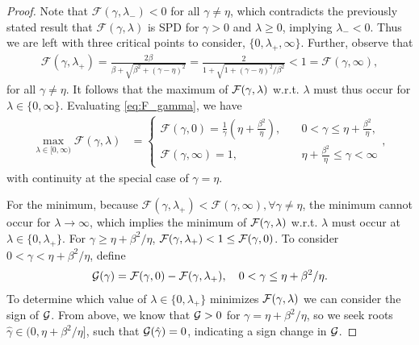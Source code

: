 \documentclass[review]{siamart}
\begin{document}
\begin{proof}
Note that $\mathcal{F}(\gamma,\lambda_-) < 0$ for all $\gamma\neq\eta$, which
contradicts the previously stated result that $\mathcal{F}(\gamma,\lambda)$ is SPD
for $\gamma > 0$ and $\lambda\geq 0$, implying $\lambda_- < 0$.
Thus we are left with three critical points to consider, 
$\{0,\lambda_+,\infty\}$. Further, observe that
%
\begin{align*}
\mathcal{F}(\gamma,\lambda_+) = \frac{2\beta}{\beta + \sqrt{\beta^2 + (\gamma-\eta)^2}}
	= \frac{2}{1 + \sqrt{1 + (\gamma-\eta)^2/\beta^2}} < 1 = \mathcal{F}(\gamma,\infty),
\end{align*}
%
for all $\gamma \neq \eta$.
It follows that the maximum of ${\cal F}(\gamma,\lambda)$ w.r.t.
$\lambda$ must thus occur for $\lambda \in \{ 0, \infty \}$. Evaluating
\eqref{eq:F_gamma}, we have
%
\begin{align}\label{eq:eig_max}
\max_{\lambda\in[0,\infty)} \mathcal{F}(\gamma,\lambda) & = 
\begin{cases}
\displaystyle
\mathcal{F}(\gamma,0) 
= 
\frac{1}{\gamma} \left(\eta + \frac{\beta^2}{\eta} \right), 
\quad 
& 0 < \gamma \leq \eta +  \tfrac{\beta^2}{\eta}, \\
\displaystyle
\mathcal{F}(\gamma,\infty) 
= 
1, \quad & \eta + \tfrac{\beta^2}{\eta} \leq \gamma < \infty
\end{cases},
\end{align}
%
with continuity at the special case of $\gamma = \eta$.

For the minimum, because $\mathcal{F}(\gamma,\lambda_+) < \mathcal{F}(\gamma,\infty),
\forall \gamma \neq \eta$, the minimum cannot occur for $\lambda \to \infty$, which
implies the minimum of ${\cal F}(\gamma,\lambda)$ w.r.t. $\lambda$ must occur
at $\lambda \in \{0, \lambda_+\}$. For $\gamma \geq \eta + \beta^2 / \eta$,
${\cal F}(\gamma, \lambda_+) < 1 \leq {\cal F}(\gamma, 0)$. To consider
$0 < \gamma < \eta + \beta^2 / \eta$, define
%
\begin{align*}
{\cal G}(\gamma) = \mathcal{F}(\gamma,0) -  \mathcal{F}(\gamma,\lambda_+),
	\quad 0 < \gamma \leq \eta + \beta^2 / \eta.
\end{align*}
%
To determine which value of ${\lambda} \in \{0, \lambda_+ \}$ minimizes
${\cal F}(\gamma, \lambda)$ we can consider the sign of ${\cal G}$. From
above, we know that ${\cal G} > 0$ for $\gamma = \eta + \beta^2/\eta$, so
we seek roots $\hat{\gamma}\in(0,\eta+\beta^2/\eta]$, such that
${\cal G}(\hat{\gamma}) = 0$, indicating a sign change in ${\cal G}$.


\end{proof}
\end{document}
